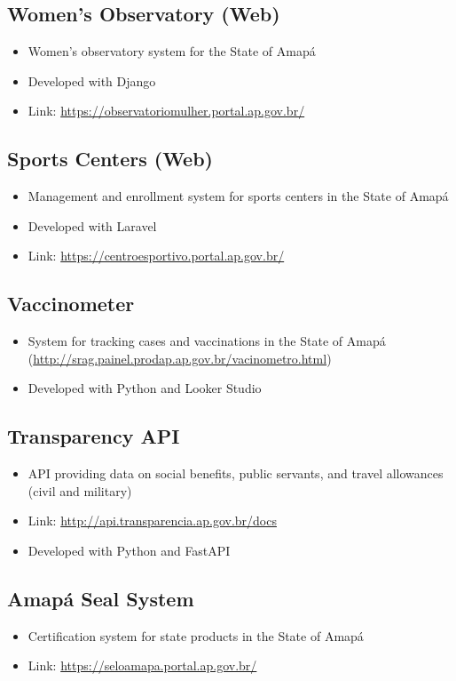 \documentclass{article}
\begin{document}
\subsection{Women’s Observatory (Web)}
\begin{itemize}
  \item Women’s observatory system for the State of Amapá
  \item Developed with Django
  \item Link: \url{https://observatoriomulher.portal.ap.gov.br/}
\end{itemize}

\subsection{Sports Centers (Web)}
\begin{itemize}
  \item Management and enrollment system for sports centers in the State of Amapá
  \item Developed with Laravel
  \item Link: \url{https://centroesportivo.portal.ap.gov.br/}
\end{itemize}

\subsection{Vaccinometer}
\begin{itemize}
  \item System for tracking cases and vaccinations in the State of Amapá (\url{http://srag.painel.prodap.ap.gov.br/vacinometro.html})
  \item Developed with Python and Looker Studio
\end{itemize}

\subsection{Transparency API}
\begin{itemize}
  \item API providing data on social benefits, public servants, and travel allowances (civil and military)
  \item Link: \url{http://api.transparencia.ap.gov.br/docs}
  \item Developed with Python and FastAPI
\end{itemize}

\subsection{Amapá Seal System}
\begin{itemize}
  \item Certification system for state products in the State of Amapá
  \item Link: \url{https://seloamapa.portal.ap.gov.br/}
\end{itemize}
\end{document}
